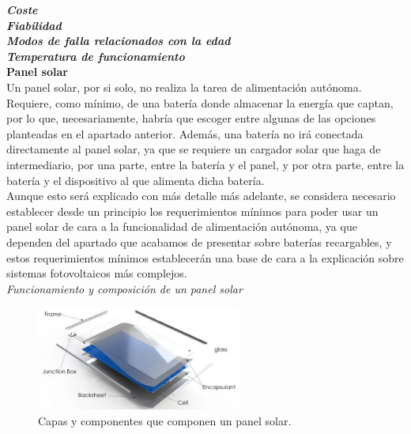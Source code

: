 \documentclass[12pt]{article}
\begin{document}
	\noindent \textit{\textbf{Coste}}\\
	
	\noindent \textit{\textbf{Fiabilidad}}\\		
	
	\noindent \textit{\textbf{Modos de falla relacionados con la edad}}\\	
	
	\noindent \textit{\textbf{Temperatura de funcionamiento}}\\	
	
	\noindent \textbf{Panel solar}\\ 
	
	\noindent Un panel solar, por si solo, no realiza la tarea de alimentación autónoma. Requiere, como mínimo, de una batería donde almacenar la energía que captan, por lo que, necesariamente, habría que escoger entre algunas de las opciones planteadas en el apartado anterior. Además, una batería no irá conectada directamente al panel solar, ya que se requiere un cargador solar que haga de intermediario, por una parte, entre la batería y el panel, y por otra parte, entre la batería y el dispositivo al que alimenta dicha batería. \\
	
	\noindent Aunque esto será explicado con más detalle más adelante, se considera necesario establecer desde un principio los requerimientos mínimos para poder usar un panel solar de cara a la funcionalidad de alimentación autónoma, ya que dependen del apartado que acabamos de presentar sobre baterías recargables, y estos requerimientos mínimos establecerán una base de cara a la explicación sobre sistemas fotovoltaicos más complejos. \\
	
	\noindent \textit{Funcionamiento y composición de un panel solar}
	
	\begin{figure}[h]
		\begin{center}
			\includegraphics[width=0.6\textwidth]{img/layersSolarPanel.png}
			\caption{Capas y componentes que componen un panel solar.}
			\label{fig: capas panel solar}
		\end{center}
	\end{figure}
\end{document}
